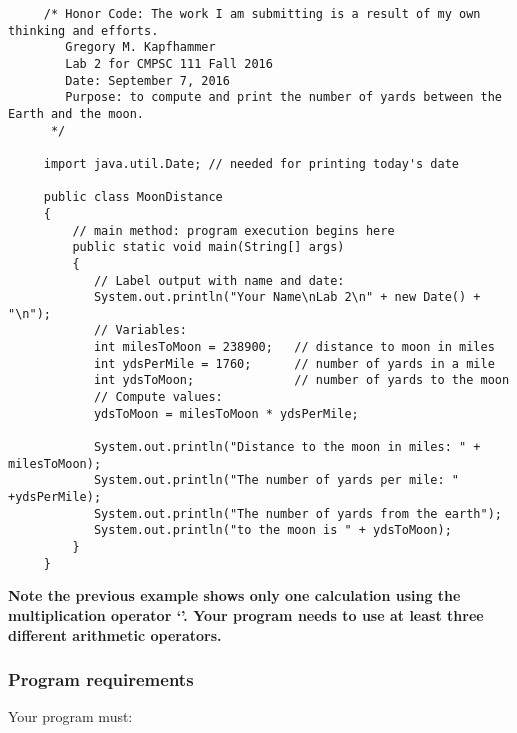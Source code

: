  \vspace*{-.15in}

\begin{verbatim}
     /* Honor Code: The work I am submitting is a result of my own thinking and efforts.
        Gregory M. Kapfhammer
        Lab 2 for CMPSC 111 Fall 2016
        Date: September 7, 2016
        Purpose: to compute and print the number of yards between the Earth and the moon.
      */

     import java.util.Date; // needed for printing today's date

     public class MoonDistance
     {
         // main method: program execution begins here
         public static void main(String[] args)
         {
            // Label output with name and date:
            System.out.println("Your Name\nLab 2\n" + new Date() + "\n");
            // Variables:
            int milesToMoon = 238900;   // distance to moon in miles
            int ydsPerMile = 1760;      // number of yards in a mile
            int ydsToMoon;              // number of yards to the moon
            // Compute values:
            ydsToMoon = milesToMoon * ydsPerMile;

            System.out.println("Distance to the moon in miles: " + milesToMoon);
            System.out.println("The number of yards per mile: " +ydsPerMile);
            System.out.println("The number of yards from the earth");
            System.out.println("to the moon is " + ydsToMoon);
         }
     }
\end{verbatim}

\noindent \textbf{Note the previous example shows only one calculation using the multiplication operator `{\tt *}'. Your program
needs to use at least three different arithmetic operators. }

\vspace*{-.2in}
\subsubsection*{Program requirements}
\noindent Your program must:

